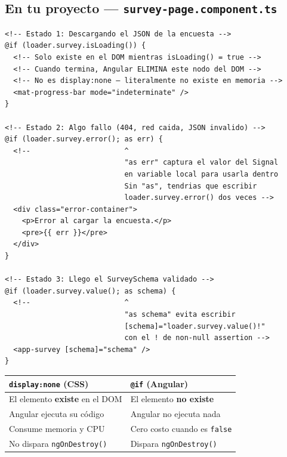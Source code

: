 \documentclass[12pt, a4paper]{article}
\begin{document}
\subsection{En tu proyecto --- \texttt{survey-page.component.ts}}

\begin{lstlisting}
<!-- Estado 1: Descargando el JSON de la encuesta -->
@if (loader.survey.isLoading()) {
  <!-- Solo existe en el DOM mientras isLoading() = true -->
  <!-- Cuando termina, Angular ELIMINA este nodo del DOM -->
  <!-- No es display:none — literalmente no existe en memoria -->
  <mat-progress-bar mode="indeterminate" />
}

<!-- Estado 2: Algo fallo (404, red caida, JSON invalido) -->
@if (loader.survey.error(); as err) {
  <!--                      ^
                            "as err" captura el valor del Signal
                            en variable local para usarla dentro
                            Sin "as", tendrias que escribir
                            loader.survey.error() dos veces -->
  <div class="error-container">
    <p>Error al cargar la encuesta.</p>
    <pre>{{ err }}</pre>
  </div>
}

<!-- Estado 3: Llego el SurveySchema validado -->
@if (loader.survey.value(); as schema) {
  <!--                      ^
                            "as schema" evita escribir
                            [schema]="loader.survey.value()!"
                            con el ! de non-null assertion -->
  <app-survey [schema]="schema" />
}
\end{lstlisting}

\begin{tcolorbox}[peligro, title={\emoji{warning} \texttt{@if} NO es \texttt{display:none}}]
\begin{center}
\renewcommand{\arraystretch}{1.4}
\begin{tabular}{p{5.5cm} p{6cm}}
\textbf{\texttt{display:none} (CSS)} & \textbf{\texttt{@if} (Angular)} \\
\hline
El elemento \textbf{existe} en el DOM & El elemento \textbf{no existe} \\
Angular ejecuta su código & Angular no ejecuta nada \\
Consume memoria y CPU & Cero costo cuando es \texttt{false} \\
No dispara \texttt{ngOnDestroy()} & Dispara \texttt{ngOnDestroy()} \\
\end{tabular}
\end{center}
\end{tcolorbox}
\end{document}
